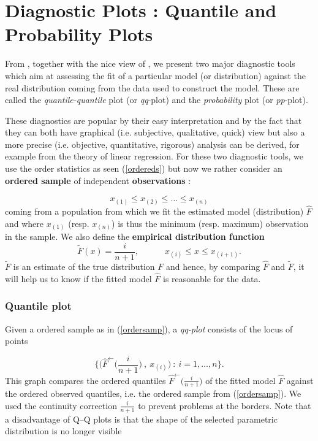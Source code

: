\section{Diagnostic Plots : Quantile and Probability Plots}\label{app:qqpp}

From \citet[pp.18-36]{beirlant_practical_1996}, together with the nice view of \citet[pp.36-37]{coles_introduction_2001}, we present two major diagnostic tools which aim at assessing the fit of a particular model (or distribution) against the real distribution coming from the data used to construct the model.
These are called the \emph{quantile-quantile} plot (or \emph{qq}-plot) and the \emph{probability} plot (or \emph{pp}-plot). 

These diagnostics are popular by their easy interpretation and by the fact that they can both have graphical (i.e. subjective, qualitative, quick) view but also a more precise (i.e. objective, quantitative, rigorous) analysis can be derived, for example from the theory of linear regression. 
\newline
For these two diagnostic tools, we use the order statistics as seen (\ref{ordereds}) but now we rather consider an \textbf{ordered sample} of independent \textbf{observations} :

\begin{equation} \label{ordersamp}
x_{(1)}\leq x_{(2)}\leq\dots\leq x_{(n)}
\end{equation}
coming from a population from which we fit the estimated model (distribution) $\hat{F}$ and where $x_{(1)}$ (resp. $x_{(n)}$) is thus the minimum (resp. maximum) observation in the sample. We also define the \textbf{empirical distribution function}
\begin{equation}\label{eq:emprdist}
\tilde{F}(x)=\frac{i}{n+1}, \qquad\quad x_{(i)}\leq x\leq x_{(i+1)}.
\end{equation}
$\tilde{F}$ is an estimate of the true distribution $F$ and hence, by comparing $\hat{F}$ and $\tilde{F}$, it will help us to know if the fitted model $\hat{F}$ is reasonable for the data.

\subsubsection*{Quantile plot} Given a ordered sample as in (\ref{ordersamp}), a \emph{qq-plot} consists of the locus of points 

\begin{equation}
\Bigg\{\bigg(\hat{F}^{\leftarrow}\Big(\frac{i}{n+1}\Big)\ ,\ x_{(i)}\bigg) \ : \ i=1,\dots,n\Bigg\}.
\end{equation}
This graph compares the ordered quantiles $\hat{F}^{\leftarrow}\Big(\frac{i}{n+1}\Big)$ of the fitted model $\hat{F}$ against the ordered observed quantiles, i.e. the ordered sample from (\ref{ordersamp}).
We used the continuity correction $\frac{i}{n+1}$ to prevent problems at the borders.
Note that a disadvantage of Q–Q plots is that the shape of the selected
parametric distribution is no longer visible \citet[pp.63]{beirlant_statistics_2006}

